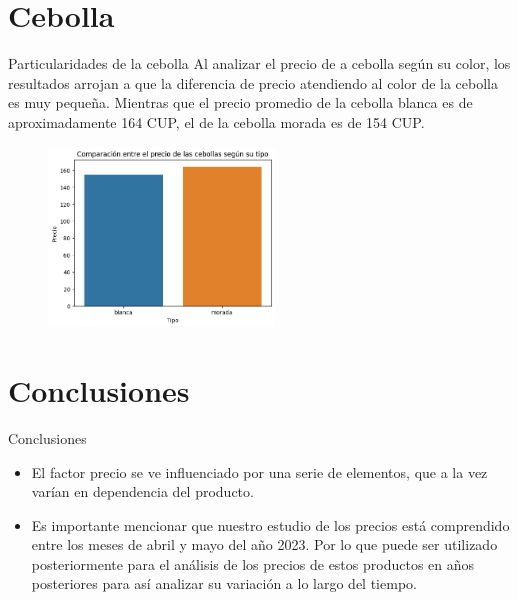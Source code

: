 \documentclass{beamer}
\begin{document}
 \section{Cebolla}
    \begin{frame}{Particularidades de la cebolla}
         \small Al analizar el precio de a cebolla según su color, los resultados arrojan a que la diferencia de precio atendiendo al color de la cebolla es muy pequeña. Mientras que el precio promedio de la cebolla blanca es de aproximadamente 164 CUP, el de la cebolla morada es de 154 CUP.
        \begin{figure}[h]
       	\centering
       	\includegraphics[width=6cm]{onion.png}
       \end{figure}

    \end{frame}

\section{Conclusiones}
    \begin{frame}{Conclusiones}
        \begin{itemize}
        \item El factor precio se ve influenciado por una serie de elementos, que a la vez varían en dependencia del producto.
        \item Es importante mencionar que nuestro estudio de los precios está comprendido entre los meses de abril y mayo del año 2023. Por lo que puede ser utilizado posteriormente para el análisis de los precios de estos productos en años posteriores para así analizar su variación a lo largo del tiempo. 
        \end{itemize}
    \end{frame}
\end{document}
